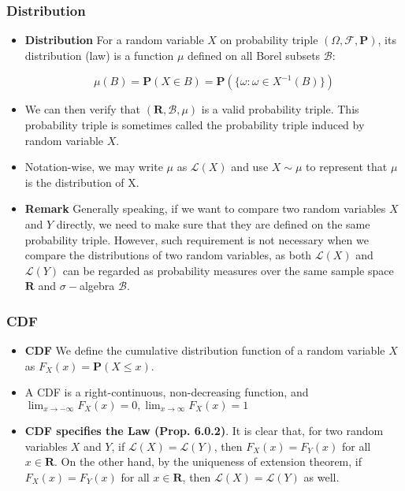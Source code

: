 \documentclass[handout]{beamer}
\newcommand{\BP}{\mathbf{P}}
\begin{document}
\frame
{
  \frametitle{Distribution}

   \begin{itemize}
   \item<1-> \textbf{Distribution}  For a random variable $X$ on probability triple $(\Omega, \mathcal{F}, \BP)$, its distribution (law) is a function $\mu$ defined on all Borel subsets $\mathcal{B}$:
   
   $$\mu(B)=\BP(X\in B)=\BP(\{\omega:\omega\in X^{-1} (B)\})$$ 
   
      \item<2-> We can then verify that $(\mathbf{R}, \mathcal{B}, \mu)$ is a valid probability triple. This probability triple is sometimes called the probability triple induced by random variable $X$. 
      
       \item<3-> Notation-wise, we may write $\mu$ as $\mathcal{L}(X)$ and use $X\sim \mu$ to represent that $\mu$ is the distribution of X.
       
      \item<4-> \textbf{Remark} Generally speaking, if we want to compare two random variables $X$ and $Y$ directly, we need to make sure that they are defined on the same probability triple. However, such requirement is not necessary when we compare the distributions of two random variables, as both $\mathcal{L}(X)$ and $\mathcal{L}(Y)$ can be regarded as probability measures over the same sample space $\mathbf{R}$ and $\sigma-$algebra $\mathcal{B}$.
                                                                   
\end{itemize}
}




\frame
{
  \frametitle{CDF}

   \begin{itemize}
  
                \item<1-> \textbf{CDF} We define the cumulative distribution function of a random variable $X$ as $F_X(x)=\BP(X\leq x)$. 
                
                \item<2-> A CDF is a right-continuous, non-decreasing function, and $\lim_{x\rightarrow -\infty }F_X(x)=0, \lim_{x\rightarrow \infty }F_X(x)=1$

	\item<3->\textbf{CDF specifies the Law (Prop. 6.0.2)}. It is clear that, for two random variables $X$ and $Y$, if $\mathcal{L}(X)=\mathcal{L} (Y)$, then $F_X(x)=F_Y(x)$ for all $x\in \mathbf{R}$. On the other hand, by the uniqueness of extension theorem, if $F_X(x)=F_Y(x)$ for all $x\in \mathbf{R}$, then $\mathcal{L}(X)=\mathcal{L} (Y)$ as well.                                             
\end{itemize}
}
\end{document}
